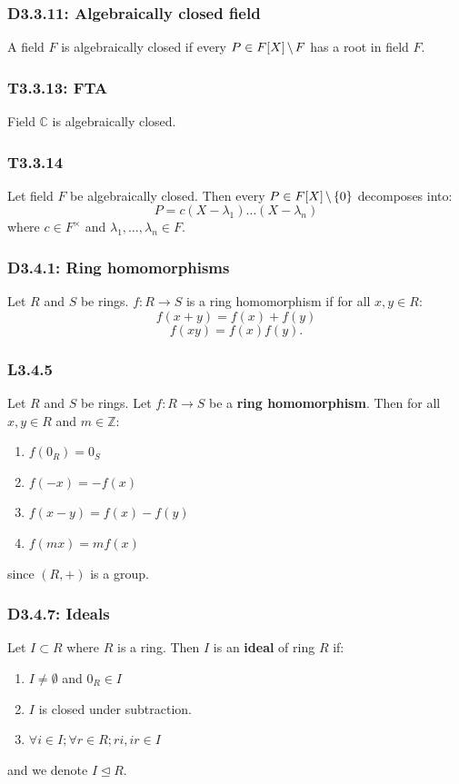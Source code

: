 \documentclass{article}
\begin{document}
\begin{multicols*}{3}
\subsubsection*{D3.3.11: Algebraically closed field}
A field $F$ is algebraically closed if every
$P\in F[X]\hspace{0.02in}\backslash\hspace{0.02in}F$
has a root in field $F$.

\subsubsection*{T3.3.13: FTA}
Field $\mathbb{C}$ is algebraically closed.

\subsubsection*{T3.3.14}
Let field $F$ be algebraically closed. Then every
$P\in F[X]\hspace{0.02in}\backslash\hspace{0.02in}\{0\}$
decomposes into:
$$P=c(X-\lambda_1)\dots(X-\lambda_n)$$
where $c\in F^{\times}$ and $\lambda_1,\dots,\lambda_n\in F$.

\subsubsection*{D3.4.1: Ring homomorphisms}
Let $R$ and $S$ be rings. $f:R\rightarrow S$ is a ring
homomorphism if for all $x,y\in R$:
$$f(x+y)=f(x)+f(y)$$
$$f(xy)=f(x)f(y).$$

\subsubsection*{L3.4.5}
Let $R$ and $S$ be rings. Let $f:R\rightarrow S$ be a
\textbf{ring homomorphism}.
Then for all $x,y\in R$ and $m\in\mathbb{Z}$:
\begin{enumerate}
    \item $f(0_R)=0_S$
    \item $f(-x)=-f(x)$
    \item $f(x-y)=f(x)-f(y)$
    \item $f(mx)=mf(x)$
\end{enumerate}
since $(R,+)$ is a group.

\subsubsection*{D3.4.7: Ideals}
Let $I\subset R$ where $R$ is a ring. Then
$I$ is an \textbf{ideal} of ring $R$ if:
\begin{enumerate}
    \item $I\neq\emptyset$ and $0_R\in I$
    \item $I$ is closed under subtraction.
    \item $\forall i\in I;\forall r\in R;
    ri,ir\in I$
\end{enumerate}
and we denote $I\trianglelefteq R$.


\end{multicols*}
\end{document}

